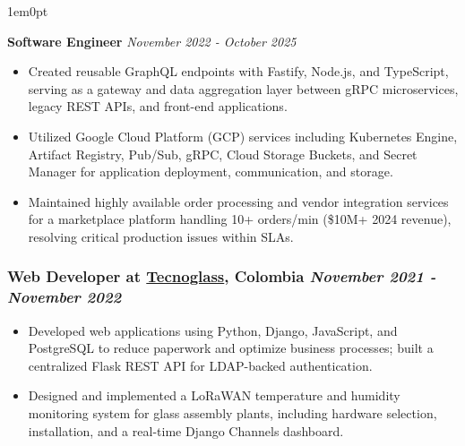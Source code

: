 \documentclass[a4paper,10pt]{article}
\begin{document}
\begin{adjustwidth}{1em}{0pt}
\begin{itemize}
\end{itemize}

\smallskip
\noindent\textbf{Software Engineer}
\hfill\textit{November 2022 - October 2025}
\begin{itemize}
  \item Created reusable GraphQL endpoints with Fastify, Node.js, and TypeScript, serving as a gateway and data aggregation layer between gRPC microservices, legacy REST APIs, and front-end applications.
  \item Utilized Google Cloud Platform (GCP) services including Kubernetes Engine, Artifact Registry, Pub/Sub, gRPC, Cloud Storage Buckets, and Secret Manager for application deployment, communication, and storage.
  \item Maintained highly available order processing and vendor integration services for a marketplace platform handling 10+ orders/min (\$10M+ 2024 revenue), resolving critical production issues within SLAs.
\end{itemize}
\end{adjustwidth}

\subsubsection*{%
  \textbf{Web Developer} at \href{https://www.tecnoglass.com/en/}{\textbf{Tecnoglass}}, Colombia
  \hfill
  \textit{November 2021 - November 2022}
}
\begin{itemize}
  \item Developed web applications using Python, Django, JavaScript, and PostgreSQL to reduce paperwork and optimize business processes; built a centralized Flask REST API for LDAP-backed authentication.
  \item Designed and implemented a LoRaWAN temperature and humidity monitoring system for glass assembly plants, including hardware selection, installation, and a real-time Django Channels dashboard.
\end{itemize}
\end{document}
